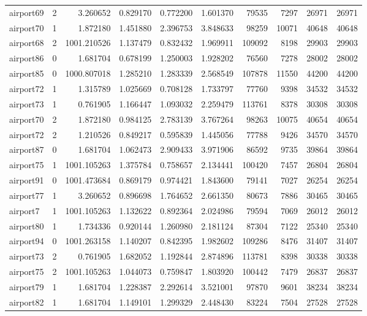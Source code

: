 \begin{longtable}{|l|r|r|r|r|r|r|r|r|r|}
airport69 & 2 & 3.260652 & 0.829170 & 0.772200 & 1.601370 & 79535 & 7297 & 26971 & 26971 \\
airport70 & 1 & 1.872180 & 1.451880 & 2.396753 & 3.848633 & 98259 & 10071 & 40648 & 40648 \\
airport68 & 2 & 1001.210526 & 1.137479 & 0.832432 & 1.969911 & 109092 & 8198 & 29903 & 29903 \\
airport86 & 0 & 1.681704 & 0.678199 & 1.250003 & 1.928202 & 76560 & 7278 & 28002 & 28002 \\
airport85 & 0 & 1000.807018 & 1.285210 & 1.283339 & 2.568549 & 107878 & 11550 & 44200 & 44200 \\
airport72 & 1 & 1.315789 & 1.025669 & 0.708128 & 1.733797 & 77760 & 9398 & 34532 & 34532 \\
airport73 & 1 & 0.761905 & 1.166447 & 1.093032 & 2.259479 & 113761 & 8378 & 30308 & 30308 \\
airport70 & 2 & 1.872180 & 0.984125 & 2.783139 & 3.767264 & 98263 & 10075 & 40654 & 40654 \\
airport72 & 2 & 1.210526 & 0.849217 & 0.595839 & 1.445056 & 77788 & 9426 & 34570 & 34570 \\
airport87 & 0 & 1.681704 & 1.062473 & 2.909433 & 3.971906 & 86592 & 9735 & 39864 & 39864 \\
airport75 & 1 & 1001.105263 & 1.375784 & 0.758657 & 2.134441 & 100420 & 7457 & 26804 & 26804 \\
airport91 & 0 & 1001.473684 & 0.869179 & 0.974421 & 1.843600 & 79141 & 7027 & 26254 & 26254 \\
airport77 & 1 & 3.260652 & 0.896698 & 1.764652 & 2.661350 & 80673 & 7886 & 30465 & 30465 \\
airport7 & 1 & 1001.105263 & 1.132622 & 0.892364 & 2.024986 & 79594 & 7069 & 26012 & 26012 \\
airport80 & 1 & 1.734336 & 0.920144 & 1.260980 & 2.181124 & 87304 & 7122 & 25340 & 25340 \\
airport94 & 0 & 1001.263158 & 1.140207 & 0.842395 & 1.982602 & 109286 & 8476 & 31407 & 31407 \\
airport73 & 2 & 0.761905 & 1.682052 & 1.192844 & 2.874896 & 113781 & 8398 & 30338 & 30338 \\
airport75 & 2 & 1001.105263 & 1.044073 & 0.759847 & 1.803920 & 100442 & 7479 & 26837 & 26837 \\
airport79 & 1 & 1.681704 & 1.228387 & 2.292614 & 3.521001 & 97870 & 9601 & 38234 & 38234 \\
airport82 & 1 & 1.681704 & 1.149101 & 1.299329 & 2.448430 & 83224 & 7504 & 27528 & 27528 \\

\end{longtable}
